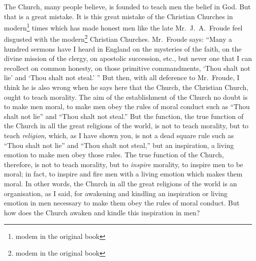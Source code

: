 The Church, many people believe, is founded to teach men the belief in God.
But that is a great mistake.
It is this great mistake of the Christian Churches in modern\footnote{modem in the original book} times which has made honest men like the late Mr.~J.~A.~Froude  feel disgusted with the modern\footnote{modem in the original book} Christian Churches.
Mr.~Fr\-oude says: ``Many a hundred sermons have I heard in England on the mysteries of the faith, on the divine mission of the clergy, on apostolic succession, etc., but never one that I can recollect on common honesty, on those primitive commandments, `Thou shalt not lie' and `Thou shalt not steal.' ''
But then, with all deference to Mr.~Froude, I think he is also wrong when he says here that the Church, the Christian Church, ought to teach morality.
The aim of the establishment of the Church no doubt is to make men moral, to make men obey the rules of moral conduct such as ``Thou shalt not lie'' and ``Thou shalt not steal.''
But the function, the true function of the Church in all the great religions of the world, is not to teach morality, but to teach \emph{religion}, which, as I have shown you, is not a dead square rule such as ``Thou shalt not lie'' and ``Thou shalt not steal,'' but an inspiration, a living emotion to make men obey those rules.
The true function of the Church, therefore, is not to teach morality, but to \emph{inspire} morality, to inspire men to be moral;
in fact, to inspire and fire men with a living emotion which makes them moral.
In other words, the Church in all the great religions of the world is an organisation, as I said, for awakening and kindling an inspiration or living emotion in men necessary to make them obey the rules of moral conduct.
But how does the Church awaken and kindle this inspiration in men?

